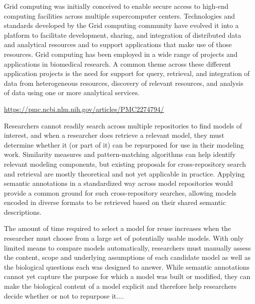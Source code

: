 \documentclass[11pt]{article}
\begin{document}
{\vspace{9pt}



\begin{blockQuote}

Grid computing was initially conceived to enable secure access to high-end computing facilities across multiple supercomputer centers.   Technologies and standards developed by the Grid computing community have evolved it into a platform to facilitate development, sharing, and integration of distributed data and analytical resources and to support applications that make use of those resources. Grid computing has been employed in a wide range of projects and applications in biomedical research. A common theme across these different application projects is the need for support for query, retrieval, and integration of data from heterogeneous resources, discovery of relevant resources, and analysis of data using one or more analytical services. 
\end{blockQuote}

\vspace{6pt}
\hfill{}

\hfill\href{https://pmc.ncbi.nlm.nih.gov/articles/PMC2274794/}{https://pmc.ncbi.nlm.nih.gov/articles/PMC2274794/}


\vspace*{12pt}

\begin{blockQuote}

Researchers cannot readily search across multiple repositories to find models of interest, and when a researcher does retrieve a relevant model, they must determine whether it (or part of it) can be repurposed for use in their modeling work. Similarity measures and pattern-matching algorithms can help identify relevant modeling components, but existing proposals for cross-repository search and retrieval are mostly theoretical and not yet applicable in practice. Applying semantic annotations in a standardized way across model repositories would provide a common ground for such cross-repository searches, allowing models encoded in diverse formats to be retrieved based on their shared semantic descriptions. 

\pseudoIndent{} The amount of time required to select a model for reuse increases when the researcher must choose from a large set of potentially usable models. With only limited means to compare models automatically, researchers must manually assess the content, scope and underlying assumptions of each candidate model as well as the biological questions each was designed to answer. While semantic annotations cannot yet capture the purpose for which a model was built or modified, they can make the biological content of a model explicit and therefore help researchers decide whether or not to repurpose it....


\end{blockQuote}}
\end{document}
